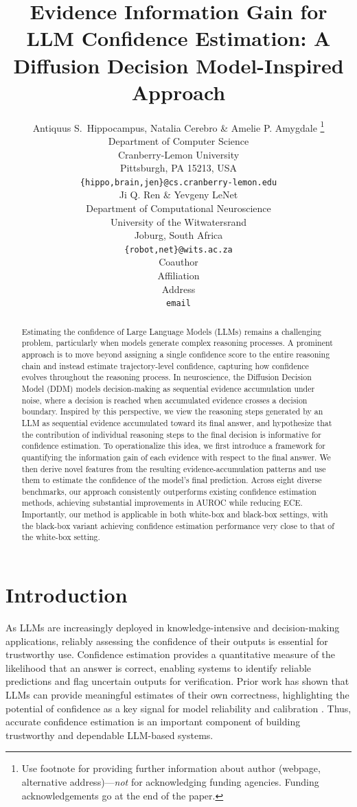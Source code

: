 \documentclass{article} %
\title{ Evidence Information Gain for LLM Confidence Estimation: A Diffusion Decision Model-Inspired Approach}
\author{Antiquus S.~Hippocampus, Natalia Cerebro \& Amelie P. Amygdale \thanks{ Use footnote for providing further information
about author (webpage, alternative address)---\emph{not} for acknowledging
funding agencies.  Funding acknowledgements go at the end of the paper.} \\
Department of Computer Science\\
Cranberry-Lemon University\\
Pittsburgh, PA 15213, USA \\
\texttt{\{hippo,brain,jen\}@cs.cranberry-lemon.edu} \\
\And
Ji Q. Ren \& Yevgeny LeNet \\
Department of Computational Neuroscience \\
University of the Witwatersrand \\
Joburg, South Africa \\
\texttt{\{robot,net\}@wits.ac.za} \\
\AND
Coauthor \\
Affiliation \\
Address \\
\texttt{email}
}
\begin{document}
\maketitle

\begin{abstract}
Estimating the confidence of Large Language Models (LLMs) remains a challenging problem, particularly when models generate complex reasoning processes. A prominent approach is to move beyond assigning a single confidence score to the entire reasoning chain and instead estimate trajectory-level confidence, capturing how confidence evolves throughout the reasoning process. In neuroscience, the Diffusion Decision Model (DDM) models decision-making as sequential evidence accumulation under noise, where a decision is reached when accumulated evidence crosses a decision boundary. Inspired by this perspective, we view the reasoning steps generated by an LLM as sequential evidence accumulated toward its final answer, and hypothesize that the contribution of individual reasoning steps to the final decision is informative for confidence estimation. To operationalize this idea, we first introduce a framework for quantifying the information gain of each evidence with respect to the final answer. We then derive novel features from the resulting evidence-accumulation patterns and use them to estimate the confidence of the model's final prediction. Across eight diverse benchmarks, our approach consistently outperforms existing confidence estimation methods, achieving substantial improvements in AUROC while reducing ECE. Importantly, our method is applicable in both white-box and black-box settings, with the black-box variant achieving confidence estimation performance very close to that of the white-box setting.
 
\end{abstract}

\section{Introduction}
As LLMs are increasingly deployed in knowledge-intensive and decision-making applications, reliably assessing the confidence of their outputs is essential for trustworthy use. Confidence estimation provides a quantitative measure of the likelihood that an answer is correct, enabling systems to identify reliable predictions and flag uncertain outputs for verification. Prior work has shown that LLMs can provide meaningful estimates of their own correctness, highlighting the potential of confidence as a key signal for model reliability and calibration \citep{kadavath2022language, jiang2021know}. Thus, accurate confidence estimation is an important component of building trustworthy and dependable LLM-based systems.
\end{document}
